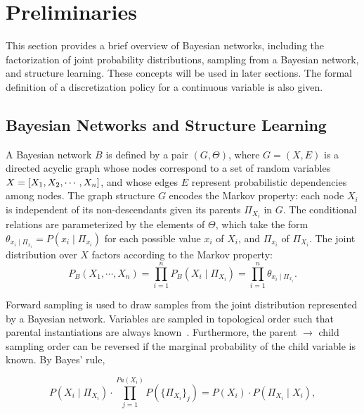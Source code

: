 
\section{Preliminaries}
\label{sec:preliminaries}
This section provides a brief overview of Bayesian networks, including the factorization of joint probability distributions, sampling from a Bayesian network, and structure learning. These concepts will be used in later sections. The formal definition of a discretization policy for a continuous variable is also given.

\subsection{Bayesian Networks and Structure Learning}

A Bayesian network $B$ is defined by a pair $(G,\Theta)$, where $G = (X,E)$ is a directed acyclic graph whose nodes correspond to a set of random variables $X = \brock{X_1, X_2, \cdots, X_n}$, and whose edges $E$ represent probabilistic dependencies among nodes. The graph structure $G$ encodes the Markov property: each node $X_i$ is independent of its non-descendants given its parents $\Pi_{X_i}$ in $G$. The conditional relations are parameterized by the elements of $\Theta$, which take the form $\theta_{x_i \mid \Pi_{x_i}} = P(x_i \mid \Pi_{x_i})$ for each possible value $x_i$ of $X_i$, and $\Pi_{x_i}$ of $\Pi_{X_i}$. The joint distribution over $X$ factors according to the Markov property:
\begin{equation}
P_B (X_1 , \cdots, X_n) = \prod_{i=1}^{n} P_B (X_i \mid \Pi_{X_i}) = \prod_{i=1}^{n} \theta_{x_i \mid \Pi_{x_i}}\text{.}
\end{equation}

Forward sampling is used to draw samples from the joint distribution represented by a Bayesian network.
Variables are sampled in topological order such that parental instantiations are always known~\citep[see][chap.~22]{algo_2009}.
Furthermore, the parent $\rightarrow$ child sampling order can be reversed if the marginal probability of the child variable is known.
By Bayes' rule,

\begin{equation}
P(X_i \mid \Pi_{X_i}) \cdot \prod_{j = 1}^{ Pa( X_i)} P( \{ \Pi_{X_i} \}_j) = P(X_i) \cdot P(\Pi_{X_i} \mid X_i),
\end{equation}

